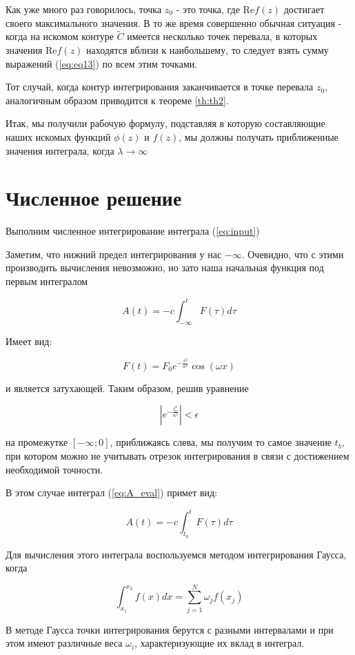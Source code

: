 \documentclass[14pt]{extarticle}
\renewcommand{\Re}{\mathrm{Re}}
\renewcommand{\Re}{\mathrm{Re}}
\begin{document}
	Как уже много раз говорилось, точка $z_0$ - это точка, где $\Re f(z)$ достигает своего максимального значения. В то же время совершенно обычная ситуация - когда на искомом контуре $\widetilde{C}$ имеется несколько точек перевала, в которых значения $\Re f (z)$ находятся вблизи к наибольшему, то следует взять сумму выражений (\ref{eq:eq13}) по всем этим точками. 
	
	Тот случай, когда контур интегрирования заканчивается в точке перевала $z_0$, аналогичным образом приводится к теореме \ref{th:th2}.
	
	Итак, мы получили рабочую формулу, подставляя в которую составляющие наших искомых функций $\phi (z)$ и $f (z)$, мы должны получать приближенные значения интеграла, когда $\lambda \rightarrow \infty$ 

\newpage
\section{Численное решение}

Выполним численное интегрирование интеграла (\ref{eq:input})

Заметим, что нижний предел интегрирования у нас $-\infty$. Очевидно, что с этими производить вычисления невозможно, но зато наша начальная функция под первым интегралом

$$
A(t) = -c\int_{-\infty}^{t} F(\tau) d\tau
$$

Имеет вид:

\begin{equation}\label{eq:A_eval}
F(t) =  F_0 e^{ -\frac{x^2}{\alpha^2} }  \cos(\omega x)
\end{equation}

и является затухающей. Таким образом, решив уравнение 

$$
|e^{ -\frac{t_b^2}{\alpha^2} }| < \epsilon
$$

на промежутке $[-\infty; 0]$, приближаясь слева, мы получим то самое значение $t_b$, при котором можно не учитывать отрезок интегрирования в связи с достижением необходимой точности.

В этом случае интеграл (\ref{eq:A_eval}) примет вид:

$$\label{eq:easy}
A(t) = -c\int_{t_b}^{t} F(\tau) d\tau
$$

Для вычисления этого интеграла воспользуемся методом интегрирования Гаусса, когда 

$$
\int_{x_1}^{x_2} f(x) dx = \sum_{j=1}^{N} \omega_j f(x_j)
$$

В методе Гаусса точки интегрирования берутся с разными интервалами и при этом имеют различные веса $\omega_i$, характеризующие их вклад в интеграл.
\end{document}

